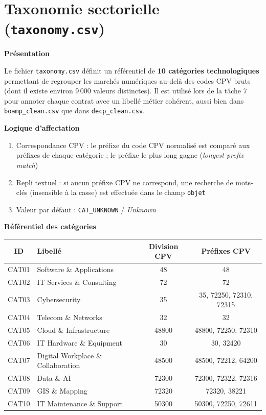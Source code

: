 \documentclass[12pt,a4paper]{article}
\begin{document}
\section{Taxonomie sectorielle (\texttt{taxonomy.csv})}
\label{sec:taxonomy}

\textbf{Présentation}

Le fichier \texttt{taxonomy.csv} définit un référentiel de \textbf{10
catégories technologiques} permettant de regrouper les marchés numériques
au-delà des codes CPV bruts (dont il existe environ 9\,000 valeurs distinctes).
Il est utilisé lors de la tâche 7 pour annoter chaque contrat avec un libellé
métier cohérent, aussi bien dans \texttt{boamp\_clean.csv} que dans
\texttt{decp\_clean.csv}.

\medskip
\textbf{Logique d'affectation}

\begin{enumerate}
  \item Correspondance CPV : le préfixe du code CPV normalisé est comparé
    aux préfixes de chaque catégorie ; le préfixe le plus long gagne
    (\textit{longest prefix match})
  \item Repli textuel : si aucun préfixe CPV ne correspond, une recherche de
    mots-clés (insensible à la casse) est effectuée dans le champ
    \texttt{objet}
  \item Valeur par défaut : \texttt{CAT\_UNKNOWN} / \textit{Unknown}
\end{enumerate}

\medskip
\textbf{Référentiel des catégories}

\begin{center}
\begin{tabular}{clcc}
\toprule
\textbf{ID} & \textbf{Libellé} & \textbf{Division CPV} &
  \textbf{Préfixes CPV} \\
\midrule
CAT01 & Software \& Applications          & 48     & 48 \\
CAT02 & IT Services \& Consulting         & 72     & 72 \\
CAT03 & Cybersecurity                     & 35     & 35, 72250, 72310, 72315 \\
CAT04 & Telecom \& Networks               & 32     & 32 \\
CAT05 & Cloud \& Infrastructure           & 48800  & 48800, 72250, 72310 \\
CAT06 & IT Hardware \& Equipment          & 30     & 30, 32420 \\
CAT07 & Digital Workplace \& Collaboration & 48500 & 48500, 72212, 64200 \\
CAT08 & Data \& AI                        & 72300  & 72300, 72322, 72316 \\
CAT09 & GIS \& Mapping                    & 72320  & 72320, 38221 \\
CAT10 & IT Maintenance \& Support         & 50300  & 50300, 72250, 72611 \\
\bottomrule
\end{tabular}
\end{center}
\end{document}
